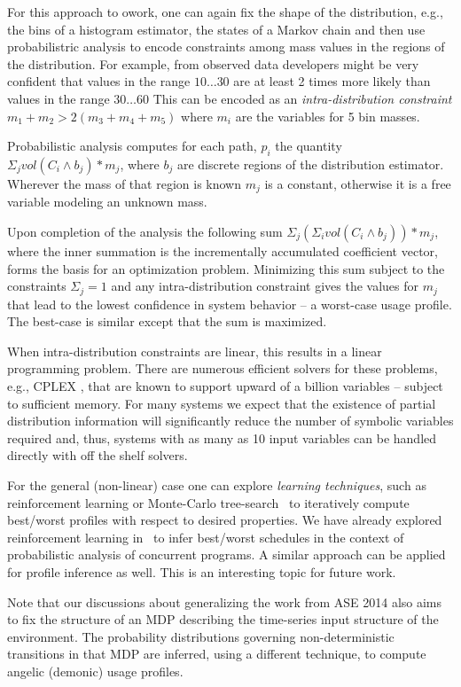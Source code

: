 For this approach to owork, one can again fix the shape of the
distribution, e.g., the bins of a histogram estimator, the states of a
Markov chain and then use probabilistric analysis to encode
constraints among mass values in the regions of the distribution.  
For example, from observed data developers might be
very confident that values in the range $10 \ldots 30$ are at least 2
times more likely than values in the range $30 \ldots 60$ This can be
encoded as an \textit{intra-distribution constraint} $m_1 + m_2 >
2(m_3 + m_4 + m_5)$ where $m_i$ are the variables for 5 bin masses.

Probabilistic analysis computes for each path, $p_i$
the quantity $\Sigma_{j} vol(C_i \wedge b_j)*m_j$, where $b_j$ are discrete
regions of the distribution estimator.  Wherever the mass
of that region is known $m_j$ is a constant, otherwise it is
a free variable modeling an unknown mass.


Upon completion of the analysis the following sum
$\Sigma_{j} (\Sigma_i vol(C_i \wedge b_j)) *m_j$, where
the inner summation 
is the incrementally accumulated coefficient vector,
forms the basis for an optimization problem.
Minimizing this sum subject to the constraints  
$\Sigma_j = 1$ and any intra-distribution constraint gives
the values for $m_j$ that lead to the lowest confidence in
system behavior -- a worst-case usage profile.  The best-case
is similar except that the sum is maximized.

When intra-distribution constraints are linear, this results
in a linear programming problem.  There are numerous efficient solvers
for these problems, e.g., CPLEX \cite{CPLEX}, that are known to
support upward of a billion variables -- subject to sufficient memory.
For many systems we expect that the existence of partial distribution
information
will significantly reduce the number of symbolic variables required
and, thus, systems with as many as 10 input variables can be handled
directly with off the shelf solvers. 

For the general (non-linear) case one can explore {\em learning
  techniques}, such as reinforcement learning or Monte-Carlo
tree-search~\cite{sutton1998reinforcement} to iteratively compute
best/worst profiles with respect to desired properties. We have
already explored reinforcement learning in~\cite{Luckow2014ASE} to
infer best/worst schedules in the context of probabilistic analysis of
concurrent programs. A similar approach can be applied for profile
inference as well. This is an interesting topic for future work.


Note that our discussions about generalizing the work from ASE 2014 
also aims to fix the structure of an MDP describing the time-series
input structure of the environment.  The probability distributions
governing non-deterministic transitions in that MDP are inferred,
using a different technique, to compute angelic (demonic) usage
profiles.

